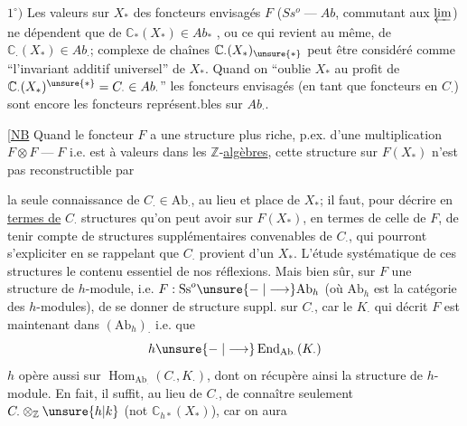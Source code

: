 $1^\circ)$ Les valeurs sur $X_*$ des foncteurs envisagés $F$
($Ss^o\mathbin{\text{---}}Ab$, commutant aux $\varprojlim$) ne dépendent que de
$\mathbb C_*(X_*)\in Ab_*$ , ou ce qui revient
au même, de $\mathbb C_{\cdot}(X_*)\in Ab_{\cdot}$;
 complexe de chaînes $\mathbb C_{\cdot}(X_*)_{\unsure{*}}$
peut être considéré comme ``l'invariant additif universel'' de $X_*$.
Quand on ``oublie $X_*$ au profit de $\mathbb C_{\cdot}(X_*)^{\unsure{*}}=C_{\cdot}\in Ab_{\cdot}$''
les foncteurs envisagés (en tant que foncteurs en $C_{\cdot}$) sont encore
 les foncteurs représent.bles sur $Ab_{\cdot}$.

[\uline{NB} Quand le foncteur $F$ a une structure plus riche, p.ex. d'une
multiplication $F\otimes F\mathbin{\text{---}}F$ i.e. est à valeurs dans les
$\mathbb Z$-\uline{algèbres},  cette structure sur $F(X_*)$
n'est pas reconstructible par

la seule connaissance de $C_\cdot\in\mathrm{Ab}_\cdot$, au lieu
et place de $X_*$; il faut, pour 
décrire en \uline{termes de} $C_\cdot$  structures
qu'on peut  avoir sur $F(X_*)$, en termes
de celle de $F$, de tenir compte de
structures supplémentaires convenables
de $C_\cdot$, qui pourront s'expliciter en se
rappelant que $C_\cdot$ provient d'un $X_*$. 
L'étude systématique de ces structures 
 
le contenu essentiel de nos réflexions.
Mais bien sûr,  
 sur $F$ une structure de
$h$-module, i.e. $F:\mathrm{Ss}^o\unsure{\mathrel{-}|\longrightarrow}\mathrm{Ab}_h$
(où $\mathrm{Ab}_h$ est la catégorie des $h$-modules),
 de se donner de structure
suppl. sur $C_\cdot$, car  
 le $K_\cdot$ qui décrit $F$ est
maintenant dans $(\mathrm{Ab}_h)_\cdot$ i.e. que
\[
h\unsure{\mathrel{-}|\longrightarrow}\operatorname{End}_{\mathrm{Ab}_\cdot}(K_\cdot)
\]
$h$ opère aussi sur $\operatorname{Hom}_{\mathrm{Ab}_\cdot}(C_\cdot,K_\cdot)$,
dont on récupère ainsi la structure
de $h$-module. En fait, il suffit,
au lieu de $C_\cdot$, de connaître
seulement  $C_\cdot\otimes_{\mathbb Z}\unsure{h|k}$ (not $\mathbb C_{h*}(X_*)$),
car on aura

